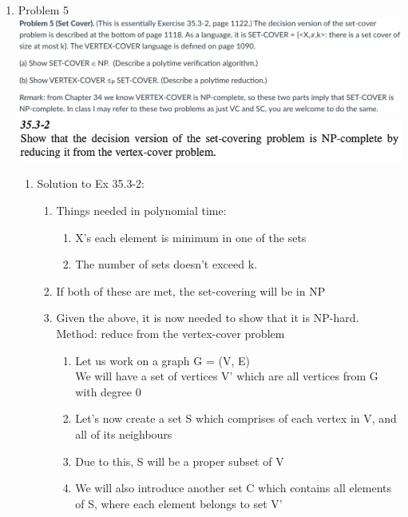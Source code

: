 \documentclass[11pt]{article}
\begin{document}
\begin{enumerate}
\begin{enumerate}
\begin{enumerate}
            
        \end{enumerate}
    \end{enumerate}

\pagebreak
\item Problem 5\\
\includegraphics[scale=0.55]{HW5_Q5_1.png}\\
\includegraphics[scale=1]{HW5_Q5_2.png}
    \begin{enumerate}
        \item Solution to Ex 35.3-2:
        \begin{enumerate}
            \item Things needed in polynomial time:
        \begin{enumerate}
            \item X's each element is minimum in one of the sets
            \item The number of sets doesn’t exceed k.
        \end{enumerate}
        \item If both of these are met, the set-covering will be in NP
        \item Given the above, it is now needed to show that it is NP-hard. \\Method: reduce from the vertex-cover problem
        \begin{enumerate}
            \item Let us work on a graph G = (V, E)\\
            We will have a set of vertices V' which are all vertices from G with degree 0
            \item Let's now create a set S which comprises of each vertex in V, and all of its neighbours
            \item Due to this, S will be a proper subset of V
            \item We will also introduce another set C which contains all elements of S, where each element belongs to set V'

\end{enumerate}
\end{enumerate}
\end{enumerate}
\end{enumerate}
\end{document}
